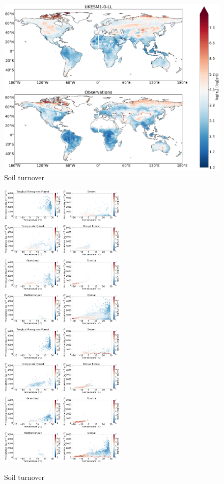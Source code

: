 \begin{figure}[t]
    \includegraphics[width=12cm]{figs/Turnover/soil_tau_map_comparison.pdf}
    \caption{Soil turnover \label{fig:SoilTurnoverlMap}}
\end{figure}

\begin{figure}[t]
    \includegraphics[width=6cm]{figs/Turnover/soil_UKESM_colouredbytau_biome_log.pdf}
    \includegraphics[width=6cm]{figs/Turnover/soil_obs1_colouredbytau_biome.pdf}
    \caption{Soil turnover \label{fig:EcoTurnoverlScatter}}
\end{figure}

